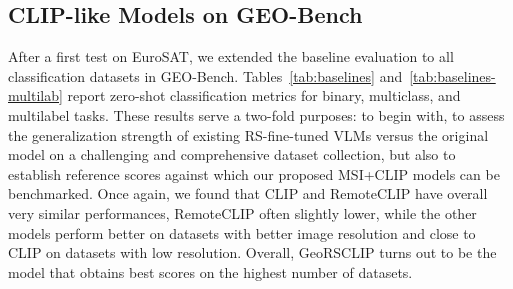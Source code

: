 \documentclass[a4paper, oneside, english]{sapthesis} %
\begin{document}
\subsection{CLIP-like Models on GEO-Bench}

After a first test on EuroSAT, we extended the baseline evaluation to all classification datasets in GEO-Bench. Tables~\ref{tab:baselines} and~\ref{tab:baselines-multilab} report zero-shot classification metrics for binary, multiclass, and multilabel tasks. 
These results serve a two-fold purposes: to begin with, to assess the generalization strength of existing RS-fine-tuned VLMs versus the original model on a challenging and comprehensive dataset collection, but also to establish reference scores against which our proposed MSI+CLIP models can be benchmarked. Once again, we found that CLIP and RemoteCLIP have overall very similar performances, RemoteCLIP often slightly lower, while the other models perform better on datasets with better image resolution and close to CLIP on datasets with low resolution. Overall, GeoRSCLIP turns out to be the model that obtains best scores on the highest number of datasets.

\vspace{0.5cm}

\begin{table}[h]
\centering
\footnotesize
\renewcommand{\arraystretch}{1.2}
\vspace{0.3cm}
\caption{\normalsize Comparison of zero-shot accuracies obtained by different models across GEO-Bench datasets.}
\label{tab:baselines}
\end{table}
\end{document}
